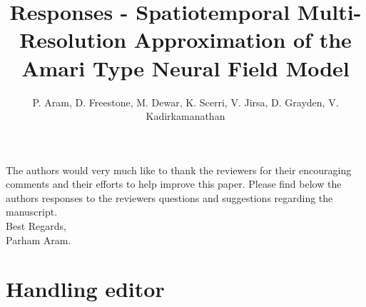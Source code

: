 \documentclass{article}
\title{Responses - Spatiotemporal Multi-Resolution Approximation of the Amari Type Neural Field Model}
\author{ P. Aram, D. Freestone, M. Dewar, K. Scerri, V. Jirsa, D. Grayden, V. Kadirkamanathan}
\begin{document}
    \maketitle

    The authors would very much like to thank the reviewers for their encouraging comments and their efforts to help improve this paper. Please find below the authors responses to the reviewers questions and suggestions regarding the manuscript. 
\\

Best Regards,
\\

Parham Aram.

\section{Handling editor}
\end{document}
